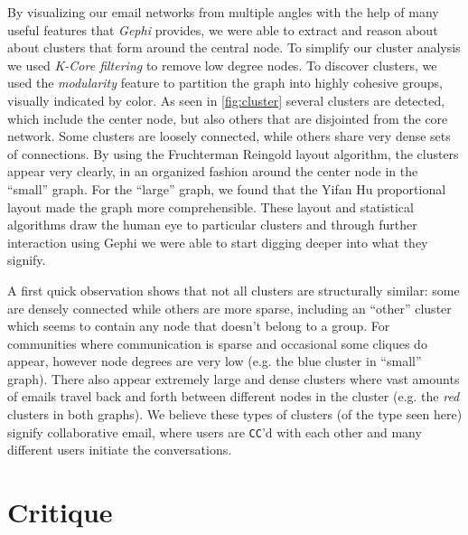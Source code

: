 \documentclass[11pt,letterpaper]{article}
\begin{document}
By visualizing our email networks from multiple angles with the help of many useful features that \textit{Gephi} provides, we were able to extract and reason about about clusters that form around the central node. To simplify our cluster analysis we used \textit{K-Core filtering} to remove low degree nodes. To discover clusters, we used the \textit{modularity} feature to partition the graph into highly cohesive groups, visually indicated by color. As seen in \ref{fig:cluster} several clusters are detected, which include the center node, but also others that are disjointed from the core network. Some clusters are loosely connected, while others share very dense sets of connections. By using the Fruchterman Reingold \cite{fruchterman_graph_1991} layout algorithm, the clusters appear very clearly, in an organized fashion around the center node in the ``small'' graph. For the ``large'' graph, we found that the Yifan Hu proportional layout \cite{hu_efficient_2005} made the graph more comprehensible. These layout and statistical algorithms draw the human eye to particular clusters and through further interaction using Gephi we were able to start digging deeper into what they signify.

A first quick observation shows that not all clusters are structurally similar: some are densely connected while others are more sparse, including an ``other'' cluster which seems to contain any node that doesn't belong to a group. For communities where communication is sparse and occasional some cliques do appear, however node degrees are very low (e.g. the blue cluster in ``small'' graph). There also appear extremely large and dense clusters where vast amounts of emails travel back and forth between different nodes in the cluster (e.g. the \textit{red} clusters in both graphs). We believe these types of clusters (of the type seen here) signify collaborative email, where users are \texttt{CC}'d with each other and many different users initiate the conversations.

\section*{Critique}
\end{document}
